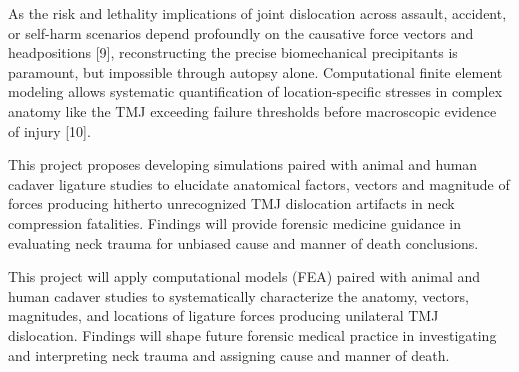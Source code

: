 \documentclass{article}
\begin{document}
As the risk and lethality implications of joint dislocation across assault, accident, or self-harm scenarios depend profoundly on the causative force vectors and headpositions [9], reconstructing the precise biomechanical precipitants is paramount, but impossible through autopsy alone. Computational finite element modeling allows systematic quantification of location-specific stresses in complex anatomy like the TMJ exceeding failure thresholds before macroscopic evidence of injury [10].

This project proposes developing simulations paired with animal and human cadaver ligature studies to elucidate anatomical factors, vectors and magnitude of forces producing hitherto unrecognized TMJ dislocation artifacts in neck compression fatalities. Findings will provide forensic medicine guidance in evaluating neck trauma for unbiased cause and manner of death conclusions. 


This project will apply computational models (FEA) paired with animal and human cadaver studies to systematically characterize the anatomy, vectors, magnitudes, and locations of ligature forces producing unilateral TMJ dislocation. Findings will shape future forensic medical practice in investigating and interpreting neck trauma and assigning cause and manner of death.

\end{document}

